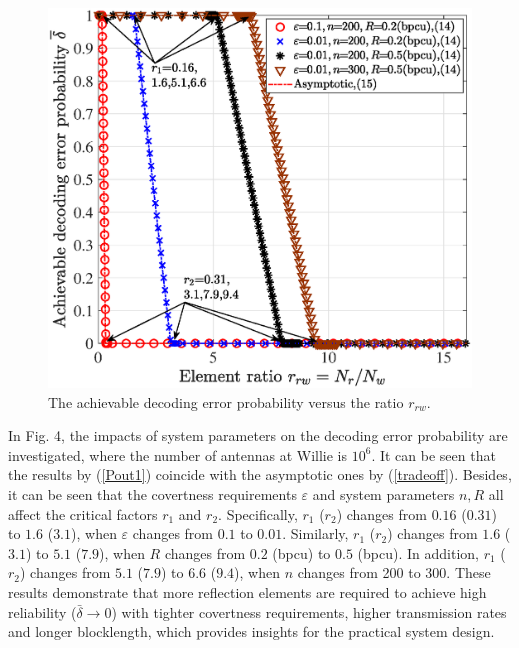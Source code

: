 \documentclass[conference]{IEEEtran}
\begin{document}
\begin{figure}
	\centering
	\includegraphics[width=0.85\linewidth]{figure/fig4_re.eps}
	\caption{The achievable decoding error probability versus the ratio $r_{rw}$.}
	\label{fig_sim}
\end{figure}
In Fig. 4, the impacts of system parameters on the decoding error probability are investigated, where the number of antennas at Willie is $10^6$. It can be seen that the results by (\ref{Pout1}) coincide with the asymptotic ones by (\ref{tradeoff}). Besides, it can be seen that the covertness requirements $\varepsilon$ and system parameters $n,R$ all affect the critical factors $r_1$ and $r_2$. Specifically, $r_1$ ($r_2$) changes from $0.16$ ($0.31$) to $1.6$ ($3.1$), when $\varepsilon$ changes from $0.1$ to $0.01$. Similarly, $r_1$ ($r_2$) changes from $1.6$ ($3.1$) to $5.1$ ($7.9$), when $R$ changes from $0.2$ (bpcu) to $0.5$ (bpcu). In addition, $r_1$ ($r_2$) changes from $5.1$ ($7.9$) to $6.6$ ($9.4$), when $n$ changes from 200 to 300. These results demonstrate that more reflection elements are required to achieve high reliability ($\bar\delta\!\to\!0$) with tighter covertness requirements, higher transmission rates and longer blocklength, which provides insights for the practical system design.
\end{document}
